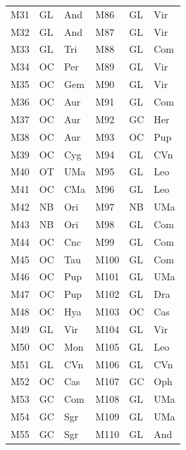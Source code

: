 \begin{longtable}{@{}lll@{\qquad}lll@{}}
M31 & GL & And & M86 & GL & Vir\\
M32 & GL & And & M87 & GL & Vir\\
M33 & GL & Tri & M88 & GL & Com\\
M34 & OC & Per & M89 & GL & Vir\\
M35 & OC & Gem & M90 & GL & Vir\\
M36 & OC & Aur & M91 & GL & Com\\
M37 & OC & Aur & M92 & GC & Her\\
M38 & OC & Aur & M93 & OC & Pup\\
M39 & OC & Cyg & M94 & GL & CVn\\
M40 & OT & UMa & M95 & GL & Leo\\
M41 & OC & CMa & M96 & GL & Leo\\
M42 & NB & Ori & M97 & NB & UMa\\
M43 & NB & Ori & M98 & GL & Com\\
M44 & OC & Cnc & M99 & GL & Com\\
M45 & OC & Tau & M100 & GL & Com\\
M46 & OC & Pup & M101 & GL & UMa\\
M47 & OC & Pup & M102 & GL & Dra\\
M48 & OC & Hya & M103 & OC & Cas\\
M49 & GL & Vir & M104 & GL & Vir\\
M50 & OC & Mon & M105 & GL & Leo\\
M51 & GL & CVn & M106 & GL & CVn\\
M52 & OC & Cas & M107 & GC & Oph\\
M53 & GC & Com & M108 & GL & UMa\\
M54 & GC & Sgr & M109 & GL & UMa\\
M55 & GC & Sgr & M110 & GL & And\\
\end{longtable}

